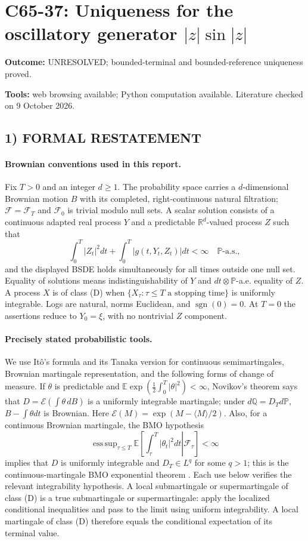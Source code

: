 \documentclass[11pt,a4paper]{article}
\newcommand{\R}{\mathbb R}
\newcommand{\E}{\mathbb E}
\newcommand{\Pp}{\mathbb P}
\newcommand{\Q}{\mathbb Q}
\newcommand{\F}{\mathcal F}
\newcommand{\cE}{\mathcal E}
\newcommand{\sgn}{\operatorname{sgn}}
\DeclareMathOperator*{\esssup}{ess\,sup}
\theoremstyle{definition}
\begin{document}
\section*{C65-37: Uniqueness for the oscillatory generator \texorpdfstring{$|z|\sin|z|$}{|z| sin |z|}}
\textbf{Outcome:} UNRESOLVED; bounded-terminal and bounded-reference uniqueness proved.\par\textbf{Tools:} web browsing available; Python computation available. Literature checked on 9 October 2026.
\subsection*{1) FORMAL RESTATEMENT}
\paragraph{Brownian conventions used in this report.}
Fix $T>0$ and an integer $d\ge1$. The probability space carries a $d$-dimensional Brownian motion $B$ with its completed, right-continuous natural filtration; $\F=\F_T$ and $\F_0$ is trivial modulo null sets. A scalar solution consists of a continuous adapted real process $Y$ and a predictable $\R^d$-valued process $Z$ such that
\[
 \int_0^T |Z_t|^2dt+\int_0^T|g(t,Y_t,Z_t)|dt<\infty\quad\Pp\text{-a.s.},
\]
and the displayed BSDE holds simultaneously for all times outside one null set. Equality of solutions means indistinguishability of $Y$ and $dt\otimes\Pp$-a.e. equality of $Z$. A process $X$ is of class (D) when $\{X_\tau:\tau\le T\text{ a stopping time}\}$ is uniformly integrable. Logs are natural, norms Euclidean, and $\sgn(0)=0$. At $T=0$ the assertions reduce to $Y_0=\xi$, with no nontrivial $Z$ component.

\paragraph{Precisely stated probabilistic tools.}
We use It\^o's formula and its Tanaka version for continuous semimartingales, Brownian martingale representation, and the following forms of change of measure. If $\theta$ is predictable and $\E\exp(\frac12\int_0^T|\theta|^2)<\infty$, Novikov's theorem says that
$D=\cE(\int\theta\,dB)$ is a uniformly integrable martingale; under $d\Q=D_Td\Pp$, $B-\int\theta dt$ is Brownian. Here $\cE(M)=\exp(M-\langle M\rangle/2)$. Also, for a continuous Brownian martingale, the BMO hypothesis
\[
 \esssup_{\tau\le T}\E\left[\left.\int_\tau^T|\theta_t|^2dt\right|\F_\tau\right]<\infty
\]
implies that $D$ is uniformly integrable and $D_T\in L^q$ for some $q>1$; this is the continuous-martingale BMO exponential theorem \cite{Kazamaki}. Each use below verifies the relevant integrability hypothesis. A local submartingale or supermartingale of class (D) is a true submartingale or supermartingale: apply the localized conditional inequalities and pass to the limit using uniform integrability. A local martingale of class (D) therefore equals the conditional expectation of its terminal value.
\end{document}
